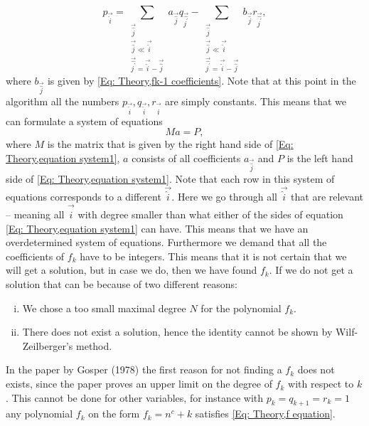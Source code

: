 \begin{equation}\label{Eq: Theory,equation system1}
  p_\vec{\hat{i}} = \sum_{\substack{\vec{\hat{j}}\\\vec{\hat{j}}\ll\vec{\hat{i}}\\\vec{\hat{j^\prime}}=\vec{\hat{i}}-\vec{\hat{j}}}} a_{\vec{\hat{j}}}q_{\vec{\hat{j^\prime}}} - \sum_{\substack{\vec{\hat{j}}\\\vec{\hat{j}}\ll\vec{\hat{i}}\\\vec{\hat{j^\prime}}=\vec{\hat{i}}-\vec{\hat{j}}}} b_{\vec{\hat{j}}}r_{\vec{\hat{j^\prime}}},
\end{equation}
where $b_{\vec{\hat{j}}}$ is given by \eqref{Eq: Theory,fk-1 coefficients}. Note that at this point in the algorithm all the numbers $p_\vec{\hat{i}},q_\vec{\hat{i}},r_\vec{\hat{i}}$ are simply constants. This means that we can formulate a system of equations
\begin{equation}\label{Eq: Theory,equation system2}
  Ma=P,
\end{equation}
where $M$ is the matrix that is given by the right hand side of \eqref{Eq: Theory,equation system1}, $a$ consists of all coefficients $a_{\vec{\hat{j}}}$ and $P$ is the left hand side of \eqref{Eq: Theory,equation system1}. Note that each row in this system of equations corresponds to a different $\vec{\hat{i}}$. Here we go through all $\vec{\hat{i}}$ that are relevant -- meaning all $\vec{\hat{i}}$ with degree smaller than what either of the sides of equation \eqref{Eq: Theory,equation system1} can have. This means that we have an overdetermined system of equations. Furthermore we demand that all the coefficients of $f_k$ have to be integers. This means that it is not certain that we will get a solution, but in case we do, then we have found $f_k$. If we do not get a solution that can be because of two different reasons:
\begin{enumerate}[i)]
  \item We chose a too small maximal degree $N$ for the polynomial $f_k$.
  \item There does not exist a solution, hence the identity cannot be shown by Wilf-Zeilberger's method.
\end{enumerate}
In the paper by Gosper (1978) the first reason for not finding a $f_k$ does not exists, since the paper proves an upper limit on the degree of $f_k$ with respect to $k$. This cannot be done for other variables, for instance with $p_k=q_{k+1}=r_k=1$ any polynomial $f_k$ on the form $f_k=n^c+k$ satisfies \eqref{Eq: Theory,f equation}.

